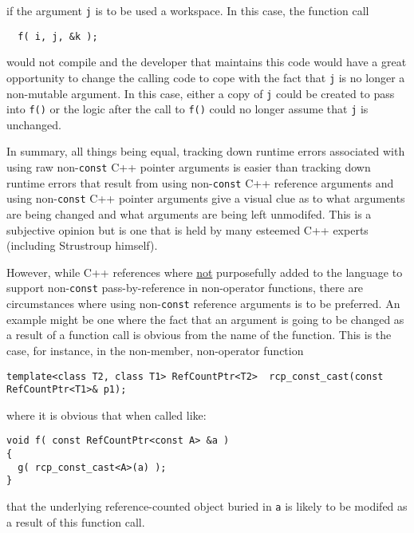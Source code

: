 {}\noindent{}if the argument {}\texttt{j} is to be used a workspace.
In this case, the function call

{\scriptsize\begin{verbatim}
  f( i, j, &k );
\end{verbatim}}

{}\noindent{}would not compile and the developer that maintains this
code would have a great opportunity to change the calling code to cope
with the fact that {}\texttt{j} is no longer a non-mutable argument.
In this case, either a copy of {}\texttt{j} could be created to pass
into {}\texttt{f()} or the logic after the call to {}\texttt{f()}
could no longer assume that {}\texttt{j} is unchanged.

In summary, all things being equal, tracking down runtime errors
associated with using raw non-\texttt{const} C++ pointer arguments is
easier than tracking down runtime errors that result from using
non-\texttt{const} C++ reference arguments and using
non-\texttt{const} C++ pointer arguments give a visual clue as to what
arguments are being changed and what arguments are being left
unmodifed.  This is a subjective opinion but is one that is held by
many esteemed C++ experts (including Strustroup himself).

However, while C++ references where {}\underline{not} purposefully
added to the language to support non-\texttt{const} pass-by-reference
in non-operator functions, there are circumstances where using
non-\texttt{const} reference arguments is to be preferred.  An example
might be one where the fact that an argument is going to be changed as
a result of a function call is obvious from the name of the function.
This is the case, for instance, in the non-member, non-operator function

{\scriptsize\begin{verbatim}
template<class T2, class T1> RefCountPtr<T2>  rcp_const_cast(const RefCountPtr<T1>& p1);
\end{verbatim}}

{}\noindent{}where it is obvious that when called like:

{\scriptsize\begin{verbatim}
void f( const RefCountPtr<const A> &a )
{
  g( rcp_const_cast<A>(a) );
}
\end{verbatim}}

{}\noindent{}that the underlying reference-counted object buried in
{}\texttt{a} is likely to be modifed as a result of this function
call.

